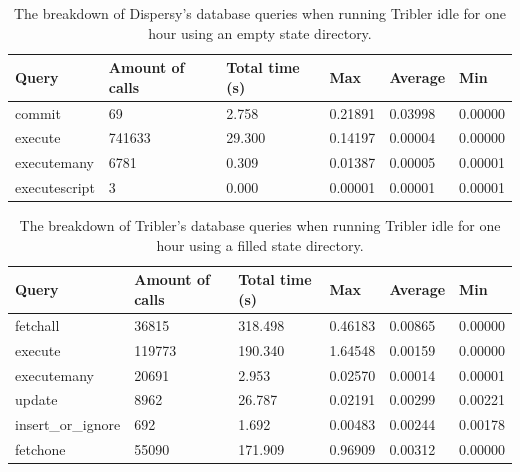 \begin{table}[h]
	\centering
	\caption{The breakdown of Dispersy's database queries when running Tribler idle for one hour using an empty state directory.}
	\label{table:query_breakdown_dispersy_empty_state_dir}
	\begin{tabular}{|l|l|l|l|l|l|}
		\hline
		\textbf{Query} & \textbf{Amount of calls} & \textbf{Total time (s)} & \textbf{Max} & \textbf{Average} & \textbf{Min} \\ \hline
		commit         & 69                       & 2.758                   & 0.21891      & 0.03998          & 0.00000      \\ \hline
		execute        & 741633                   & 29.300                  & 0.14197      & 0.00004          & 0.00000      \\ \hline
		executemany    & 6781                     & 0.309                   & 0.01387      & 0.00005          & 0.00001      \\ \hline
		executescript  & 3                        & 0.000                   & 0.00001      & 0.00001          & 0.00001      \\ \hline
	\end{tabular}
\end{table}

\begin{table}[h]
	\centering
	\caption{The breakdown of Tribler's database queries when running Tribler idle for one hour using a filled state directory.}
	\label{table:query_breakdown_tribler_filled_state_dir}
	\begin{tabular}{|l|l|l|l|l|l|}
		\hline
		\textbf{Query} & \textbf{Amount of calls} & \textbf{Total time (s)} & \textbf{Max} & \textbf{Average} & \textbf{Min} \\ \hline
		fetchall   & 36815   & 318.498   & 0.46183   & 0.00865   & 0.00000   \\ \hline
		execute   & 119773   & 190.340   & 1.64548   & 0.00159   & 0.00000   \\ \hline
		executemany   & 20691   & 2.953   & 0.02570   & 0.00014   & 0.00001   \\ \hline
		update   & 8962   & 26.787   & 0.02191   & 0.00299   & 0.00221   \\ \hline
		insert\_or\_ignore   & 692   & 1.692   & 0.00483   & 0.00244   & 0.00178   \\ \hline
		fetchone   & 55090   & 171.909   & 0.96909   & 0.00312   & 0.00000   \\ \hline
	\end{tabular}
\end{table}

